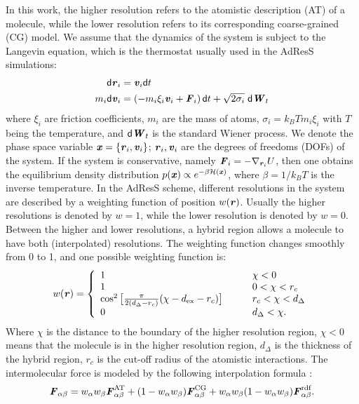 \documentclass[aip,jcp,a4paper,reprint,onecolumn]{revtex4-1}
\newcommand{\vect}[1]{\textbf{\textit{#1}}}
\newcommand{\dd}[1]{\textsf{#1}}
\newcommand{\AT}{{\textrm{{AT}}}}
\newcommand{\CG}{{\textrm{CG}}}
\newcommand{\HY}{{\Delta}}
\newcommand{\rdf}{{\textrm{rdf}}}
\begin{document}
In this work, the higher resolution refers to the atomistic
description (AT) of a molecule, while the lower resolution refers to
its corresponding coarse-grained (CG) model.  We assume that the dynamics of the
system is subject to the Langevin equation, which is the thermostat
usually used in the AdResS simulations:
\begin{align}
  \dd d\vect r_i &= \vect v_i\dd dt\\
  m_i\dd d\vect v_i &= (-m_i\xi_i\vect v_i + \vect F_i)\,\dd dt + \sqrt{2\sigma_i}\;\dd d\vect W_t
\end{align}
where $\xi_i$ are friction coefficients,
$m_i$ are the mass of atoms, $\sigma_i = k_BTm_i\xi_i$ with $T$ being
the temperature, and
$\dd d\vect W_t$ is the standard Wiener process. We denote the
phase space variable $\vect x = \{\vect r_i, \vect v_i\}$; $\vect r_i,
\vect v_i$ are the degrees of freedoms (DOFs) of the system.  If the
system is conservative, namely $\vect F_i = -\nabla_{\vect r_i}U$,
then one obtains the equilibrium density distribution $p(\vect
x)\propto e^{-\beta\mathcal H(\vect x)}$, where $\beta = 1/k_BT$ is the inverse temperature. In the AdResS scheme,
different resolutions in the system are described by a weighting
function of position $w(\vect r)$. Usually the higher resolutions is
denoted by $w = 1$, while the lower resolution is denoted by $w = 0$.
Between the higher and lower resolutions, a hybrid region allows a 
molecule to have both (interpolated) resolutions. The weighting function changes smoothly
from 0 to 1, and one possible weighting function is:
\begin{align}\label{eqn:new-w}
  w(\vect r) =
  \left\{
    \begin{array}{lcl}
      1 &\quad& \chi < 0\\
      1  && 0 < \chi < r_c\\
      \cos^2\big[\frac{\pi}{2(d_{\HY} - r_c)} (\chi - d_{\textrm{ex}} - r_c)\big] && r_c < \chi < d_{\HY} \\
      0 &&  d_{\HY}  < \chi.
    \end{array}
  \right.
\end{align}
Where $\chi$ is the distance to the boundary of the higher resolution
region, $\chi < 0$ means that the molecule is in the higher resolution
region, $d_{\HY}$ is the thickness of the hybrid region, $r_c$ is the
cut-off radius of the atomistic interactions.  The intermolecular force is modeled by the following
interpolation formula \cite{rdfcorr}:
\begin{align}
  \vect F_{\alpha\beta} =
  w_\alpha w_\beta\vect F^{\AT}_{\alpha\beta} +
  (1-w_\alpha w_\beta)\vect F^{\CG}_{\alpha\beta} +
  w_\alpha w_\beta (1-w_\alpha w_\beta)\vect F_{\alpha\beta}^{\rdf}.
\label{grf}
\end{align}
\end{document}
